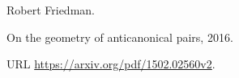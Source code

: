 Robert Friedman.

\newblock On the geometry of anticanonical pairs, 2016.

\newblock URL \url{https://arxiv.org/pdf/1502.02560v2}.

